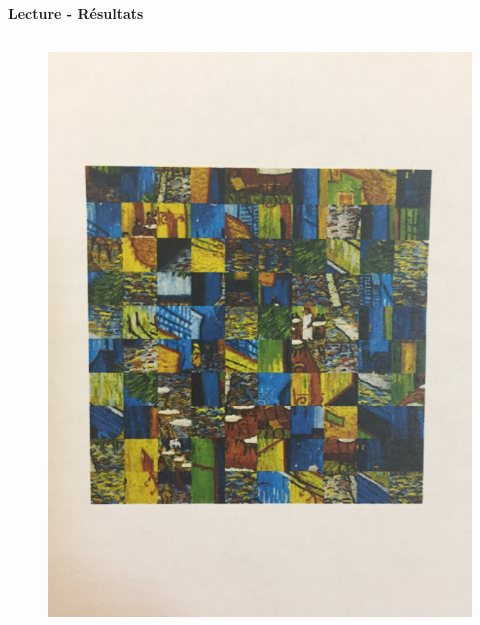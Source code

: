 \documentclass{beamer}
\begin{document}
\begin{frame}[t]
\begin{columns}[t]
\begin{column}{.49\linewidth}
\begin{block}{\centering \textbf{Lecture - Résultats}}
\begin{columns}[t]
                        \begin{column}{.2\linewidth}
                            \begin{figure}[t]
                                \includegraphics[width=\linewidth]{rsc/van_gogh_picture_10.png}\\
                            \end{figure}
                        \end{column}


\end{columns}
\end{block}
\end{column}
\end{columns}
\end{frame}
\end{document}
